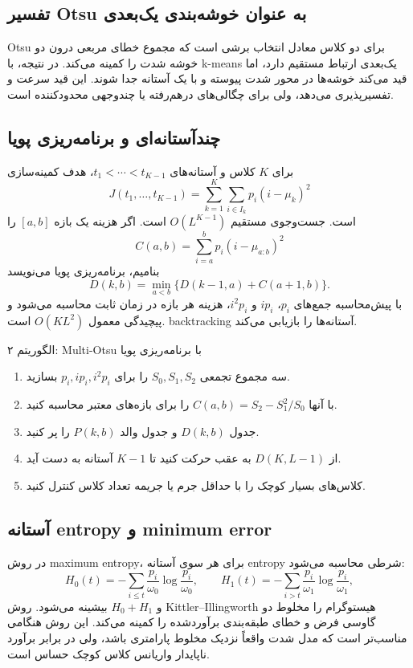 \documentclass[12pt,openany,oneside]{book}
\begin{document}
\subsection{تفسیر Otsu به عنوان خوشه‌بندی یک‌بعدی}
Otsu برای دو کلاس معادل انتخاب برشی است که مجموع خطای مربعی درون دو خوشه شدت را کمینه می‌کند. در نتیجه، با
k-means یک‌بعدی ارتباط مستقیم دارد، اما قید می‌کند خوشه‌ها در محور شدت پیوسته و با یک آستانه جدا شوند. این قید
سرعت و تفسیرپذیری می‌دهد، ولی برای چگالی‌های درهم‌رفته یا چندوجهی محدودکننده است.

\subsection{چندآستانه‌ای و برنامه‌ریزی پویا}
برای \(K\) کلاس و آستانه‌های \(t_1<\cdots<t_{K-1}\)، هدف کمینه‌سازی
\[
J(t_1,\ldots,t_{K-1})=
\sum_{k=1}^{K}\sum_{i\in I_k}p_i(i-\mu_k)^2
\]
است. جست‌وجوی مستقیم \(O(L^{K-1})\) است. اگر هزینه یک بازه \([a,b]\) را
\[
C(a,b)=\sum_{i=a}^{b}p_i(i-\mu_{a:b})^2
\]
بنامیم، برنامه‌ریزی پویا می‌نویسد
\[
D(k,b)=\min_{a< b}\{D(k-1,a)+C(a+1,b)\}.
\]
با پیش‌محاسبه جمع‌های \(p_i\)، \(ip_i\) و \(i^2p_i\)، هزینه هر بازه در زمان ثابت محاسبه می‌شود و پیچیدگی
معمول \(O(KL^2)\) است. backtracking آستانه‌ها را بازیابی می‌کند.

\begin{algorithmbox}{الگوریتم ۲: Multi-Otsu با برنامه‌ریزی پویا}
\begin{enumerate}
\item سه مجموع تجمعی \(S_0,S_1,S_2\) را برای \(p_i,ip_i,i^2p_i\) بسازید.
\item با آنها \(C(a,b)=S_2-S_1^2/S_0\) را برای بازه‌های معتبر محاسبه کنید.
\item جدول \(D(k,b)\) و جدول والد \(P(k,b)\) را پر کنید.
\item از \(D(K,L-1)\) به عقب حرکت کنید تا \(K-1\) آستانه به دست آید.
\item کلاس‌های بسیار کوچک را با حداقل جرم یا جریمه تعداد کلاس کنترل کنید.
\end{enumerate}
\end{algorithmbox}

\subsection{آستانه entropy و minimum error}
در روش maximum entropy، برای هر سوی آستانه entropy شرطی محاسبه می‌شود:
\[
H_0(t)=-\sum_{i\le t}\frac{p_i}{\omega_0}\log\frac{p_i}{\omega_0},
\qquad
H_1(t)=-\sum_{i>t}\frac{p_i}{\omega_1}\log\frac{p_i}{\omega_1},
\]
و \(H_0+H_1\) بیشینه می‌شود. روش Kittler--Illingworth هیستوگرام را مخلوط دو گاوسی فرض و خطای طبقه‌بندی
برآوردشده را کمینه می‌کند. این روش هنگامی مناسب‌تر است که مدل شدت واقعاً نزدیک مخلوط پارامتری باشد، ولی در برابر
برآورد ناپایدار واریانس کلاس کوچک حساس است.
\end{document}
